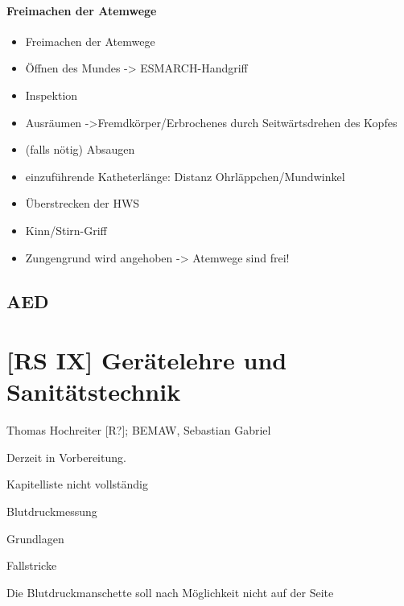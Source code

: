 \documentclass{article}
\begin{document}
\paragraph{Freimachen der Atemwege}
\begin{itemize}
\item Freimachen der Atemwege

\end{itemize}
\begin{itemize}
\item \"Offnen des Mundes -{\textgreater} ESMARCH-Handgriff

\item Inspektion

\item Ausr\"aumen -{\textgreater}Fremdk\"orper/Erbrochenes durch
Seitw\"artsdrehen des Kopfes

\item (falls n\"otig) Absaugen

\item einzuf\"uhrende Katheterl\"ange: Distanz Ohrl\"appchen/Mundwinkel

\item \"Uberstrecken der HWS

\item Kinn/Stirn-Griff

\item Zungengrund wird angehoben -{\textgreater} Atemwege  sind frei!

\end{itemize}
\subsection{AED}
\section{[RS IX] Ger\"atelehre und Sanit\"atstechnik}
Thomas Hochreiter [R?]; BEMAW, Sebastian Gabriel

Derzeit in Vorbereitung. 

Kapitelliste nicht vollst\"andig

Blutdruckmessung

Grundlagen

Fallstricke

Die Blutdruckmanschette soll nach M\"oglichkeit nicht auf der Seite
\end{document}
